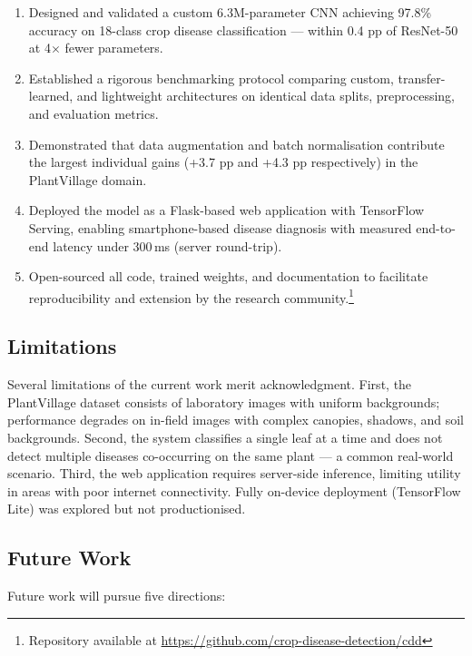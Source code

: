 \documentclass[11pt,a4paper]{article}
\begin{document}
\begin{enumerate}[label=\textbf{C\arabic*}, leftmargin=2.5em, itemsep=4pt]
  \item Designed and validated a custom 6.3M-parameter CNN achieving 97.8\%
        accuracy on 18-class crop disease classification — within 0.4 pp of
        ResNet-50 at 4$\times$ fewer parameters.
  \item Established a rigorous benchmarking protocol comparing custom,
        transfer-learned, and lightweight architectures on identical data
        splits, preprocessing, and evaluation metrics.
  \item Demonstrated that data augmentation and batch normalisation
        contribute the largest individual gains (+3.7 pp and +4.3 pp
        respectively) in the PlantVillage domain.
  \item Deployed the model as a Flask-based web application with TensorFlow
        Serving, enabling smartphone-based disease diagnosis with measured
        end-to-end latency under 300\,ms (server round-trip).
  \item Open-sourced all code, trained weights, and documentation to
        facilitate reproducibility and extension by the research
        community.\footnote{Repository available at
        \url{https://github.com/crop-disease-detection/cdd}}
\end{enumerate}

\subsection{Limitations}

Several limitations of the current work merit acknowledgment. First, the
PlantVillage dataset consists of laboratory images with uniform backgrounds;
performance degrades on in-field images with complex canopies, shadows, and
soil backgrounds. Second, the system classifies a single leaf at a time and
does not detect multiple diseases co-occurring on the same plant — a common
real-world scenario. Third, the web application requires server-side
inference, limiting utility in areas with poor internet connectivity. Fully
on-device deployment (TensorFlow Lite) was explored but not productionised.

\subsection{Future Work}

Future work will pursue five directions:
\end{document}
